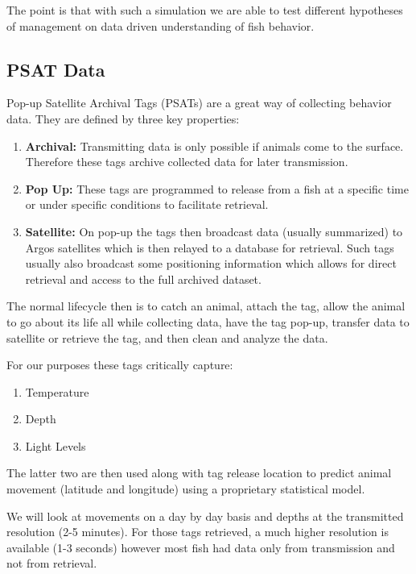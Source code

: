 \documentclass[11pt]{article}
\begin{document}
The point is that with such a simulation we are able to test different hypotheses of management on data driven understanding of fish behavior. 


\subsection{PSAT Data}

Pop-up Satellite Archival Tags (PSATs) are a great way of collecting behavior data. They are defined by three key properties:

\begin{enumerate}
\item \textbf{Archival:} Transmitting data is only possible if animals come to the surface. Therefore these tags archive collected data for later transmission. 
\item \textbf{Pop Up:} These tags are programmed to release from a fish at a specific time or under specific conditions to facilitate retrieval. 
\item \textbf{Satellite:} On pop-up the tags then broadcast data (usually summarized) to Argos satellites which is then relayed to a database for retrieval. Such tags usually also broadcast some positioning information which allows for direct retrieval and access to the full archived dataset.
\end{enumerate}

The normal lifecycle then is to catch an animal, attach the tag, allow the animal to go about its life all while collecting data, have the tag pop-up, transfer data to satellite or retrieve the tag, and then clean and analyze the data. \newline

For our purposes these tags critically capture:

\begin{enumerate}
\item Temperature
\item Depth
\item Light Levels
\end{enumerate}

The latter two are then used along with tag release location to predict animal movement (latitude and longitude) using a proprietary statistical model. 

We will look at movements on a day by day basis and depths at the transmitted resolution (2-5 minutes). For those tags retrieved, a much higher resolution is available (1-3 seconds) however most fish had data only from transmission and not from retrieval. 
\newline
\end{document}
